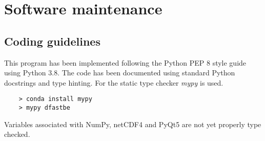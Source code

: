 \chapter{Software maintenance}

\section{Coding guidelines}

This program has been implemented following the Python PEP 8 style guide using Python 3.8.
The code has been documented using standard Python docstrings and type hinting.
For the static type checker \emph{mypy} is used.

\begin{Verbatim}
    > conda install mypy
    > mypy dfastbe
\end{Verbatim}

Variables associated with NumPy, netCDF4 and PyQt5 are not yet properly type checked.

